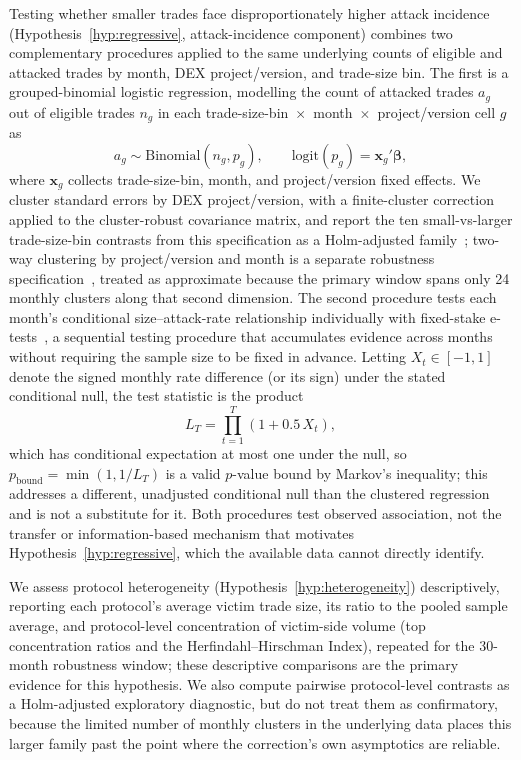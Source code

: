 \documentclass[pdflatex, sn-basic]{sn-jnl}
\theoremstyle{thmstylethree}%
\begin{document}
    Testing whether smaller trades face disproportionately higher attack incidence (Hypothesis~\ref{hyp:regressive}, attack-incidence component) combines two complementary procedures applied to the same underlying counts of eligible and attacked trades by month, DEX project/version, and trade-size bin.
    The first is a grouped-binomial logistic regression, modelling the count of attacked trades $a_g$ out of eligible trades $n_g$ in each trade-size-bin~$\times$~month~$\times$~project/version cell $g$ as
    \begin{equation}
    a_g \sim \mathrm{Binomial}(n_g, p_g), \qquad \mathrm{logit}(p_g) = \mathbf{x}_g' \boldsymbol{\beta},
    \label{eq:groupedbinomial}
    \end{equation}
    where $\mathbf{x}_g$ collects trade-size-bin, month, and project/version fixed effects.
    We cluster standard errors by DEX project/version, with a finite-cluster correction applied to the cluster-robust covariance matrix, and report the ten small-vs-larger trade-size-bin contrasts from this specification as a Holm-adjusted family~\citep{Holm1979}; two-way clustering by project/version and month is a separate robustness specification~\citep{CameronMiller2015}, treated as approximate because the primary window spans only \num{24} monthly clusters along that second dimension.
    The second procedure tests each month's conditional size--attack-rate relationship individually with fixed-stake e-tests~\citep{HowardEtAl2021,WaudbySmithRamdas2024}, a sequential testing procedure that accumulates evidence across months without requiring the sample size to be fixed in advance.
    Letting $X_t \in [-1,1]$ denote the signed monthly rate difference (or its sign) under the stated conditional null, the test statistic is the product
    \begin{equation}
    L_T = \prod_{t=1}^{T} \left(1 + 0.5\, X_t\right),
    \label{eq:etest}
    \end{equation}
    which has conditional expectation at most one under the null, so $p_{\text{bound}} = \min(1, 1/L_T)$ is a valid $p$-value bound by Markov's inequality; this addresses a different, unadjusted conditional null than the clustered regression and is not a substitute for it.
    Both procedures test observed association, not the transfer or information-based mechanism that motivates Hypothesis~\ref{hyp:regressive}, which the available data cannot directly identify.
    
    We assess protocol heterogeneity (Hypothesis~\ref{hyp:heterogeneity}) descriptively, reporting each protocol's average victim trade size, its ratio to the pooled sample average, and protocol-level concentration of victim-side volume (top concentration ratios and the Herfindahl--Hirschman Index), repeated for the 30-month robustness window; these descriptive comparisons are the primary evidence for this hypothesis.
    We also compute pairwise protocol-level contrasts as a Holm-adjusted exploratory diagnostic, but do not treat them as confirmatory, because the limited number of monthly clusters in the underlying data places this larger family past the point where the correction's own asymptotics are reliable.
    
\end{document}
